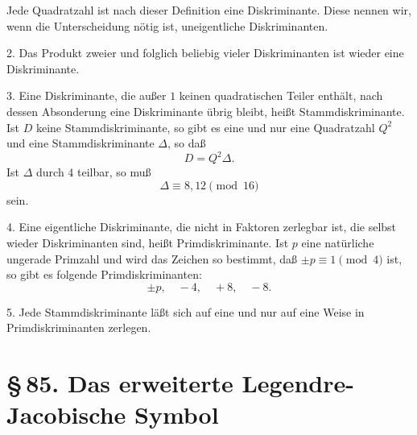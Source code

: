 \documentclass[11pt]{article}
\begin{document}
Jede Quadratzahl ist nach dieser Definition eine Diskriminante.  Diese nennen wir, wenn die Unterscheidung nötig ist, uneigentliche Diskriminanten.

2. Das Produkt zweier und folglich beliebig vieler Diskriminanten ist wieder eine Diskriminante.

3. Eine Diskriminante, die außer \(1\) keinen quadratischen Teiler enthält, nach dessen Absonderung eine Diskriminante übrig bleibt, heißt Stammdiskriminante.  Ist \(D\) keine Stammdiskriminante, so gibt es eine und nur eine Quadratzahl \(Q^2\) und eine Stammdiskriminante \(\Delta\), so daß
\begin{equation}
        D=Q^2\Delta.
\tag{2}
\end{equation}
Ist \(\Delta\) durch \(4\) teilbar, so muß
\begin{equation}
        \Delta\equiv8,12\pmod {16}
\tag{3}
\end{equation}
sein.

4. Eine eigentliche Diskriminante, die nicht in Faktoren zerlegbar ist, die selbst wieder Diskriminanten sind, heißt Primdiskriminante.  Ist \(p\) eine natürliche ungerade Primzahl und wird das Zeichen so bestimmt, daß \(\pm p\equiv1\pmod4\) ist, so gibt es folgende Primdiskriminanten:
\begin{equation}
        \pm p,\quad -4,\quad +8,\quad -8.
\tag{4}
\end{equation}

5. Jede Stammdiskriminante läßt sich auf eine und nur auf eine Weise in Primdiskriminanten zerlegen.

\section*{\S\,85. Das erweiterte Legendre-Jacobische Symbol}
\end{document}
